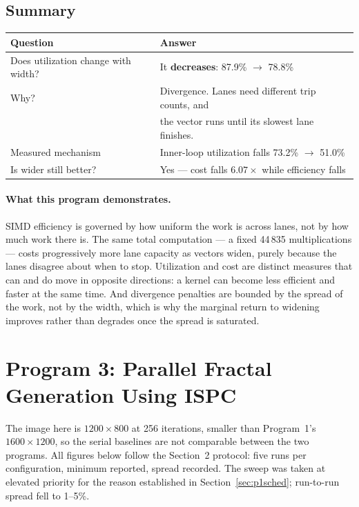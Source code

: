 \documentclass[11pt,a4paper]{article}
\begin{document}
\subsection{Summary}

\begin{table}[H]
\centering
\begin{tabular}{ll}
\toprule
Question & Answer \\
\midrule
Does utilization change with width? & It \textbf{decreases}: 87.9\% $\to$ 78.8\% \\
Why? & Divergence. Lanes need different trip counts, and \\
     & the vector runs until its slowest lane finishes. \\
Measured mechanism & Inner-loop utilization falls 73.2\% $\to$ 51.0\% \\
Is wider still better? & Yes --- cost falls $6.07\times$ while efficiency falls \\
\bottomrule
\end{tabular}
\end{table}

\paragraph{What this program demonstrates.} SIMD efficiency is governed by how
uniform the work is across lanes, not by how much work there is. The same total
computation --- a fixed 44\,835 multiplications --- costs progressively more
lane capacity as vectors widen, purely because the lanes disagree about when to
stop. Utilization and cost are distinct measures that can and do move in
opposite directions: a kernel can become less efficient and faster at the same
time. And divergence penalties are bounded by the spread of the work, not by
the width, which is why the marginal return to widening improves rather than
degrades once the spread is saturated.

\section{Program 3: Parallel Fractal Generation Using ISPC}

The image here is $1200 \times 800$ at 256 iterations, smaller than Program~1's
$1600 \times 1200$, so the serial baselines are not comparable between the two
programs. All figures below follow the Section~2 protocol: five runs per
configuration, minimum reported, spread recorded. The sweep was taken at
elevated priority for the reason established in
Section~\ref{sec:p1sched}; run-to-run spread fell to 1--5\%.
\end{document}
